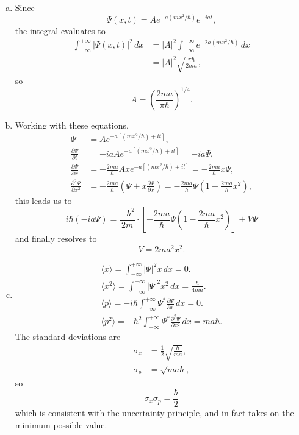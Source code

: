 \documentclass{article}
\begin{document}
\begin{enumerate}[(a)]
  \item Since \[ \Psi(x, t) = A e^{-a(mx^2/\hbar)} e^{-iat}, \] the integral
    evaluates to
    \begin{align*}
      \int_{-\infty}^{+\infty} |\Psi(x, t)|^2 \,dx
      &= |A|^2 \int_{-\infty}^{+\infty} e^{-2a(mx^2/\hbar)} \,dx \\
      &= |A|^2 \sqrt{\frac{\pi\hbar}{2ma}},
    \end{align*}
    so \[ A = \left( \frac{2ma}{\pi\hbar} \right)^{1/4}. \]
  \item Working with these equations,
    \begin{align*}
      \Psi &= Ae^{-a[(mx^2/\hbar) + it]}, \\
      \frac{\partial \Psi}{\partial t}
           &= -iaA e^{-a[(mx^2/\hbar) + it]} = -ia \Psi, \\
      \frac{\partial \Psi}{\partial x}
           &= -\frac{2ma}{\hbar} Ax e^{-a[(mx^2/\hbar) + it]}
           = -\frac{2ma}{\hbar} x \Psi, \\
      \frac{\partial^2 \Psi}{\partial x^2}
           &= -\frac{2ma}{\hbar} \left(
            \Psi + x \frac{\partial \Psi}{\partial x}
           \right)
           = -\frac{2ma}{\hbar} \Psi \left( 1 - \frac{2ma}{\hbar} x^2 \right),
    \end{align*}
    this leads us to \[
      i\hbar(-ia\Psi) = \frac{-\hbar^2}{2m} \cdot \left[
        -\frac{2ma}{\hbar} \Psi \left( 1 - \frac{2ma}{\hbar} x^2 \right)
      \right] + V\Psi
    \] and finally resolves to \[ V = 2ma^2x^2. \]
  \item
    \begin{gather*}
      \langle x \rangle = \int_{-\infty}^{+\infty} |\Psi|^2x \,dx = 0. \\
      \langle x^2 \rangle = \int_{-\infty}^{+\infty} |\Psi|^2x^2 \,dx =
        \frac{\hbar}{4ma}. \\
      \langle p \rangle = -i\hbar \int_{-\infty}^{+\infty}
        \Psi^* \frac{\partial \Psi}{\partial x}
      \,dx = 0. \\
      \langle p^2 \rangle = -\hbar^2 \int_{-\infty}^{+\infty}
        \Psi^* \frac{\partial^2 \Psi}{\partial x^2}
      \,dx = ma\hbar.
    \end{gather*} The standard deviations are
    \begin{align*}
      \sigma_x &= \frac{1}{2}\sqrt{\frac{\hbar}{ma}}, \\
      \sigma_p &= \sqrt{ma\hbar},
    \end{align*}
    so \[ \sigma_x \sigma_p = \frac{\hbar}{2} \] which is consistent with the
    uncertainty principle, and in fact takes on the minimum possible value.
\end{enumerate}
\end{document}
